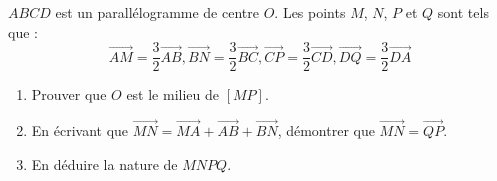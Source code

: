 
$ABCD$ est un parallélogramme de centre $O$. Les points $M$, $N$, $P$ et $Q$ sont tels que : $$ \overrightarrow{AM}=\frac{3}{2}\overrightarrow{AB}, \overrightarrow{BN}=\frac{3}{2}\overrightarrow{BC}, \overrightarrow{CP}=\frac{3}{2}\overrightarrow{CD}, \overrightarrow{DQ}=\frac{3}{2}\overrightarrow{DA} $$
\begin{enumerate}
\item Prouver que $O$ est le milieu de $[MP]$.
\item En écrivant que $\overrightarrow{MN} = \overrightarrow{MA}+\overrightarrow{AB}+\overrightarrow{BN}$, démontrer que $\overrightarrow{MN} = \overrightarrow{QP}$.
\item En déduire la nature de $MNPQ$.
\end{enumerate}
